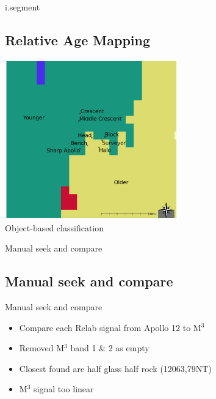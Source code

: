 \documentclass[aspectratio=169,unknownkeysallowed,xcolor=dvipsnames,beamer]{beamer} %
\begin{document}
\begin{frame}[fragile]{i.segment}
\subsection{Relative Age Mapping}
\begin{center}
  \includegraphics[width=7.5cm]{images/fig6}\\
  Object-based classification
  \end{center}
\end{frame}

\begin{frame}[fragile]{Manual seek and compare}
\subsection{Manual seek and compare}
\begin{block}{Manual seek and compare}
\begin{itemize}
\item Compare each Relab signal from Apollo 12 to M$^3$
\item Removed M$^3$ band 1 \& 2 as empty
\item Closest found are half glass half rock (12063,79NT)
\item M$^3$ signal too linear
\end{itemize}
\end{block}
\end{frame}
\end{document}
